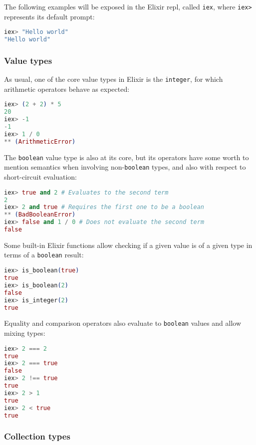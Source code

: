 The following examples will be exposed in the Elixir \gls{repl}, 
called \verb|iex|, where \verb|iex>| represents its default prompt:

\begin{lstlisting}[language=elixir,numbers=none,frame=none]
iex> "Hello world"
"Hello world"
\end{lstlisting}

\subsubsection{Value types}

As usual, one of the core value types in Elixir is the \verb|integer|, for
which arithmetic operators behave as expected:

\begin{lstlisting}[language=elixir,numbers=none,frame=none]
iex> (2 + 2) * 5
20
iex> -1
-1
iex> 1 / 0
** (ArithmeticError)
\end{lstlisting}

The \verb|boolean| value type is also at its core, but its operators have some
worth to mention semantics when involving non-\verb|boolean| types, and also 
with respect to short-circuit evaluation:

\begin{lstlisting}[language=elixir,numbers=none,frame=none]
iex> true and 2 # Evaluates to the second term
2
iex> 2 and true # Requires the first one to be a boolean
** (BadBooleanError)
iex> false and 1 / 0 # Does not evaluate the second term
false
\end{lstlisting}

Some built-in Elixir functions allow checking if a given value is of a given
type in terms of a \verb|boolean| result:

\begin{lstlisting}[language=elixir,numbers=none,frame=none]
iex> is_boolean(true)
true
iex> is_boolean(2)
false
iex> is_integer(2)
true
\end{lstlisting}

Equality and comparison operators also evaluate to \verb|boolean| values and
allow mixing types:

\begin{lstlisting}[language=elixir,numbers=none,frame=none]
iex> 2 === 2
true
iex> 2 === true
false
iex> 2 !== true
true
iex> 2 > 1
true
iex> 2 < true
true
\end{lstlisting}

\subsubsection{Collection types}

